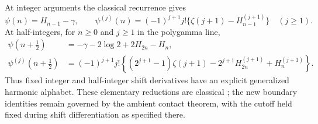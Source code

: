 At integer arguments the classical recurrence gives
\[
 \psi(n)=H_{n-1}-\gamma,\qquad
 \psi^{(j)}(n)=(-1)^{j+1}j!
       \{\zeta(j+1)-H_{n-1}^{(j+1)}\}\quad(j\ge1).
\]
At half-integers, for \(n\ge0\) and \(j\ge1\) in the polygamma line,
\begin{align*}
 \psi(n+\tfrac12)&=-\gamma-2\log2+2H_{2n}-H_n,\\
 \psi^{(j)}(n+\tfrac12)
 &=(-1)^{j+1}j!\left\{
    (2^{j+1}-1)\zeta(j+1)-2^{j+1}H_{2n}^{(j+1)}
                               +H_n^{(j+1)}\right\}.
\end{align*}
Thus fixed integer and half-integer shift derivatives have an explicit
generalized harmonic alphabet. These elementary reductions are
classical \cite{DLMF}; the new boundary identities remain governed by the
ambient contact theorem, with the cutoff held fixed during shift
differentiation as specified there.
